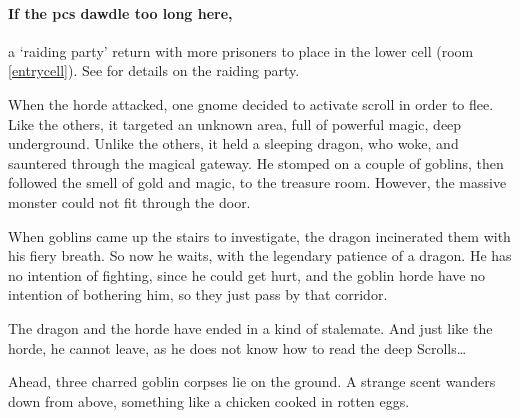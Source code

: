 \paragraph{If the \glspl{pc} dawdle too long here,}
a `raiding party' return with more prisoners to place in the lower cell (room \ref{entrycell}).
See  for details on the raiding party.



\begin{exampletext}
  When the horde attacked, one gnome decided to activate  scroll in order to flee.
  Like the others, it targeted an unknown area, full of powerful magic, deep underground.
  Unlike the others, it held a sleeping dragon, who woke, and sauntered through the magical gateway.
  He stomped on a couple of goblins, then followed the smell of gold and magic, to the treasure room.
  However, the massive monster could not fit through the door.

  When goblins came up the stairs to investigate, the dragon incinerated them with his fiery breath.
  So now he waits, with the legendary patience of a dragon.
  He has no intention of fighting, since he could get hurt, and the goblin horde have no intention of bothering him, so they just pass by that corridor.

  The dragon and the horde have ended in a kind of stalemate.
  And just like the horde, he cannot leave, as he does not know how to read the \Gls{deep} Scrolls\ldots
\end{exampletext}

\begin{boxtext}
  Ahead, three charred goblin corpses lie on the ground.
  A strange scent wanders down from above, something like a chicken cooked in rotten eggs.
\end{boxtext}


